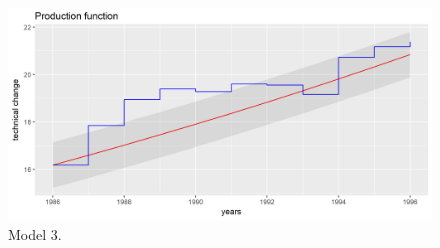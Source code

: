 \documentclass[a4paper]{article}
\begin{document}
\begin{figure}[H]
\caption{Model 3.}
\includegraphics[scale=.70]{Prod_ols_model3}
\end{figure}
\end{document}

